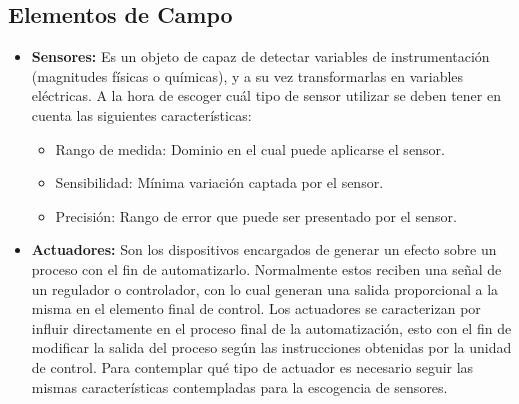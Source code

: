 \subsection{Elementos de Campo}
\begin{itemize}
\item \textbf{Sensores:}
Es un objeto de capaz de detectar variables de instrumentación (magnitudes físicas o químicas), y a su vez transformarlas en variables eléctricas. A la hora de escoger cuál tipo de sensor utilizar se deben tener en cuenta las siguientes características:
\begin{itemize}
\item{Rango de medida:}
Dominio en el cual puede aplicarse el sensor.
\item{Sensibilidad:}
Mínima variación captada por el sensor.
\item{Precisión:}
Rango de error que puede ser presentado por el sensor.
\end{itemize}
\item \textbf{Actuadores:}
Son los dispositivos encargados de generar un efecto sobre un proceso con el fin de automatizarlo. Normalmente estos reciben una señal de un regulador o controlador, con lo cual generan una salida proporcional a la misma en el elemento final de control. Los actuadores se caracterizan por influir directamente en el proceso final de la automatización, esto con el fin de modificar la salida del proceso según las instrucciones obtenidas por la unidad de control. Para contemplar qué tipo de actuador es necesario seguir las mismas características contempladas para la escogencia de sensores.
\end{itemize}
